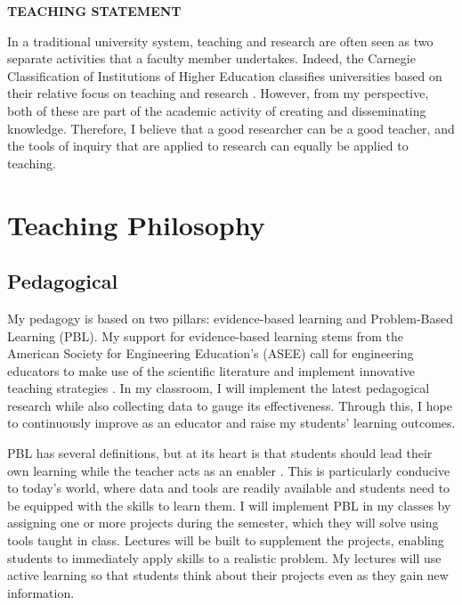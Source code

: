\documentclass[12pt]{article}
\begin{document}
 \sloppy %
\begin{center}
{\large \uppercase{\textbf{Teaching Statement}}}
\end{center}

In a traditional university system, teaching and research are often seen as two separate activities that a faculty member undertakes. Indeed, the Carnegie Classification of Institutions of Higher Education classifies universities based on their relative focus on teaching and research \cite{carnegie1994classification}. However, from my perspective, both of these are part of the academic activity of creating and disseminating knowledge. Therefore, I believe that a good researcher can be a good teacher, and the tools of inquiry that are applied to research can equally be applied to teaching. 

\section*{Teaching Philosophy}
\subsection*{Pedagogical}
My pedagogy is based on two pillars: evidence-based learning and Problem-Based Learning (PBL). My support for evidence-based learning stems from the American Society for Engineering Education's (ASEE) call for engineering educators to make use of the scientific literature and implement innovative teaching strategies \cite{jamieson2009creating}. In my classroom, I will implement the latest pedagogical research while also collecting data to gauge its effectiveness. Through this, I hope to continuously improve as an educator and raise my students' learning outcomes.

PBL has several definitions, but at its heart is that students should lead their own learning while the teacher acts as an enabler \cite{albanese1993problem}. This is particularly conducive to today's world, where data and tools are readily available and students need to be equipped with the skills to learn them. I will implement PBL in my classes by assigning one or more projects during the semester, which they will solve using tools taught in class. Lectures will be built to supplement the projects, enabling students to immediately apply skills to a realistic problem. My lectures will use active learning so that students think about their projects even as they gain new information.
\end{document}
